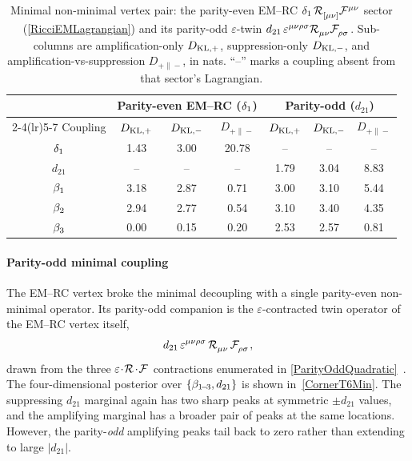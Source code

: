 \begin{table}[h]
  \centering
  \small
  \setlength{\tabcolsep}{4pt}
  \begin{tabular}{c | ccc | ccc}
  \toprule
    & \multicolumn{3}{c|}{Parity-even EM--RC ($\delta_{1}$)}
    & \multicolumn{3}{c}{Parity-odd ($d_{21}$)} \\
  \cmidrule(lr){2-4}\cmidrule(lr){5-7}
  Coupling & $D_\mathrm{KL,+}$ & $D_\mathrm{KL,-}$ & $D_{+\|-}$ & $D_\mathrm{KL,+}$ & $D_\mathrm{KL,-}$ & $D_{+\|-}$ \\
  \midrule
  $\delta_{1}$ & 1.43 & 3.00 & 20.78 & --   & --   & --   \\
  $d_{21}$  & --   & --   & --    & 1.79 & 3.04 & 8.83 \\
  $\beta_{1}$ & 3.18 & 2.87 & 0.71  & 3.00 & 3.10 & 5.44 \\
  $\beta_{2}$ & 2.94 & 2.77 & 0.54  & 3.10 & 3.40 & 4.35 \\
  $\beta_{3}$ & 0.00 & 0.15 & 0.20  & 2.53 & 2.57 & 0.81 \\
  \bottomrule
  \end{tabular}
  \caption{Minimal non-minimal vertex pair: the parity-even EM--RC
    $\Del{1}\,\MAGF{_{[\mu\nu]}}\FieldF{^{\mu\nu}}$ sector
    (\cref{RicciEMLagrangian}) and its parity-odd $\varepsilon$-twin
    $d_{21}\,\varepsilon^{\mu\nu\rho\sigma}\MAGF{_{\mu\nu}}\FieldF{_{\rho\sigma}}$.
    Sub-columns are amplification-only $D_\mathrm{KL,+}$,
    suppression-only $D_\mathrm{KL,-}$, and
    amplification-vs-suppression
    $D_{+\|-}$, in nats. ``--'' marks a
    coupling absent from that sector's Lagrangian.}
  \label{KLTableEMRCParityPair}
\end{table}

\paragraph*{Parity-odd minimal coupling}
The EM--RC vertex broke the minimal decoupling with a single
parity-even non-minimal operator. Its parity-odd companion is the
$\varepsilon$-contracted twin operator of the EM--RC vertex itself,
\begin{equation*}
  d_{21}\,\varepsilon^{\mu\nu\rho\sigma}\,
    \MAGF{_{\mu\nu}}\,\FieldF{_{\rho\sigma}},
\end{equation*}
drawn from the three
$\varepsilon\!\cdot\!\MAGF{}\!\cdot\!\FieldF{}$ contractions
enumerated in
\cref{ParityOddQuadratic}~\cite{karananas2014parity,blagojevic2018hamiltonian}.
The four-dimensional posterior over $\{\beta_{1\!-\!3}, d_{21}\}$ is
shown in~\cref{CornerT6Min}. The suppressing $d_{21}$ marginal again
has two sharp peaks at symmetric $\pm d_{21}$ values, and the
amplifying marginal has a broader pair of peaks at the same
locations. However, the
parity-\emph{odd} amplifying peaks tail back to zero rather than extending
to large $|d_{21}|$.

